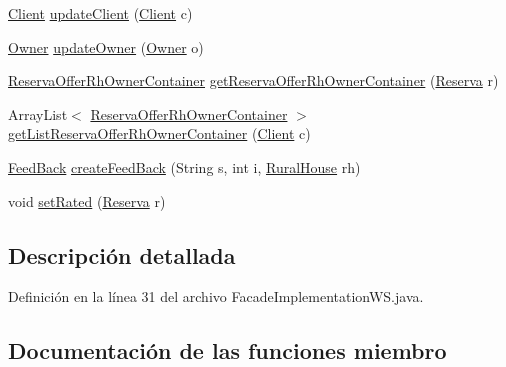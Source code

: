 \begin{DoxyCompactItemize}
\mbox{\hyperlink{classdomain_1_1_client}{Client}} \mbox{\hyperlink{classbusiness_logic_1_1_facade_implementation_w_s_a5918c2957b02255254ae252aabfe3fc1}{update\+Client}} (\mbox{\hyperlink{classdomain_1_1_client}{Client}} c)
\item 
\mbox{\hyperlink{classdomain_1_1_owner}{Owner}} \mbox{\hyperlink{classbusiness_logic_1_1_facade_implementation_w_s_a6ee2c273a768beed556dd83d9e5ad035}{update\+Owner}} (\mbox{\hyperlink{classdomain_1_1_owner}{Owner}} o)
\item 
\mbox{\hyperlink{classdomain_1_1_reserva_offer_rh_owner_container}{Reserva\+Offer\+Rh\+Owner\+Container}} \mbox{\hyperlink{classbusiness_logic_1_1_facade_implementation_w_s_a2b0b70f214ee9b8e67a2e5373d0c176d}{get\+Reserva\+Offer\+Rh\+Owner\+Container}} (\mbox{\hyperlink{classdomain_1_1_reserva}{Reserva}} r)
\item 
Array\+List$<$ \mbox{\hyperlink{classdomain_1_1_reserva_offer_rh_owner_container}{Reserva\+Offer\+Rh\+Owner\+Container}} $>$ \mbox{\hyperlink{classbusiness_logic_1_1_facade_implementation_w_s_a505c977d8d4ab62addb96006535d2912}{get\+List\+Reserva\+Offer\+Rh\+Owner\+Container}} (\mbox{\hyperlink{classdomain_1_1_client}{Client}} c)
\item 
\mbox{\hyperlink{classdomain_1_1_feed_back}{Feed\+Back}} \mbox{\hyperlink{classbusiness_logic_1_1_facade_implementation_w_s_a415b0ef5c66ce3bcec46a33750dc469f}{create\+Feed\+Back}} (String s, int i, \mbox{\hyperlink{classdomain_1_1_rural_house}{Rural\+House}} rh)
\item 
void \mbox{\hyperlink{classbusiness_logic_1_1_facade_implementation_w_s_a4ed81cb9f24d501da830d80dda086fce}{set\+Rated}} (\mbox{\hyperlink{classdomain_1_1_reserva}{Reserva}} r)
\end{DoxyCompactItemize}


\subsection{Descripción detallada}


Definición en la línea 31 del archivo Facade\+Implementation\+W\+S.\+java.



\subsection{Documentación de las funciones miembro}
\mbox{\label{classbusiness_logic_1_1_facade_implementation_w_s_aa05fbf6e32c0939508a542b857dce1d1}} 
